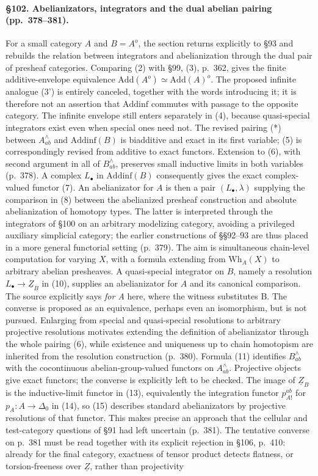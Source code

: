 \paragraph{\S102. Abelianizators, integrators and the dual abelian pairing (pp.\ 378--381).}
For a small category $A$ and $B=A^o$, the section returns explicitly to \S93 and rebuilds the relation between integrators and abelianization through the dual pair of presheaf categories. Comparing (2) with \S99, (3), p.\ 362, gives the finite additive-envelope equivalence $\mathrm{Add}(A^o)\simeq\mathrm{Add}(A)^o$. The proposed infinite analogue (3') is entirely canceled, together with the words introducing it; it is therefore not an assertion that $\mathrm{Addinf}$ commutes with passage to the opposite category. The infinite envelope still enters separately in (4), because quasi-special integrators exist even when special ones need not. The revised pairing (*) between $A^\wedge_{ab}$ and $\mathrm{Addinf}(B)$ is biadditive and exact in its first variable; (5) is correspondingly revised from additive to exact functors. Extension to (6), with second argument in all of $B^\wedge_{ab}$, preserves small inductive limits in both variables (p.\ 378). A complex $L_\bullet$ in $\mathrm{Addinf}(B)$ consequently gives the exact complex-valued functor (7). An abelianizator for $A$ is then a pair $(L_\bullet,\lambda)$ supplying the comparison in (8) between the abelianized presheaf construction and absolute abelianization of homotopy types. The latter is interpreted through the integrators of \S100 on an arbitrary modelizing category, avoiding a privileged auxiliary simplicial category; the earlier constructions of \S\S92--93 are thus placed in a more general functorial setting (p.\ 379). The aim is simultaneous chain-level computation for varying $X$, with a formula extending from $\mathrm{Wh}_A(X)$ to arbitrary abelian presheaves. A quasi-special integrator on $B$, namely a resolution $L_\bullet\to\underline Z_B$ in (10), supplies an abelianizator for $A$ and its canonical comparison. The source explicitly says \emph{for A} here, where the witness substitutes B. The converse is proposed as an equivalence, perhaps even an isomorphism, but is not pursued. Enlarging from special and quasi-special resolutions to arbitrary projective resolutions motivates extending the definition of abelianizator through the whole pairing (6), while existence and uniqueness up to chain homotopism are inherited from the resolution construction (p.\ 380). Formula (11) identifies $B^\wedge_{ab}$ with the cocontinuous abelian-group-valued functors on $A^\wedge_{ab}$. Projective objects give exact functors; the converse is explicitly left to be checked. The image of $\underline Z_B$ is the inductive-limit functor in (13), equivalently the integration functor $p^{ab}_{A!}$ for $p_A:A\to\Delta_0$ in (14), so (15) describes standard abelianizators by projective resolutions of that functor. This makes precise an approach that the cellular and test-category questions of \S91 had left uncertain (p.\ 381). The tentative converse on p.\ 381 must be read together with its explicit rejection in \S106, p.\ 410: already for the final category, exactness of tensor product detects flatness, or torsion-freeness over $\underline Z$, rather than projectivity 